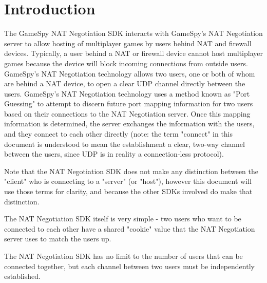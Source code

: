 \documentclass[oneside,titlepage,a4paper]{Definition/retrospy} %
\begin{document}
\chapter{Introduction}
The GameSpy NAT Negotiation SDK interacts with GameSpy's NAT Negotiation server to allow hosting of multiplayer games by users behind NAT and firewall devices. Typically, a user behind a NAT or firewall device cannot host multiplayer games because the device will block incoming connections from outside users. GameSpy's NAT Negotiation technology allows two users, one or both of whom are behind a NAT device, to open a clear UDP channel directly between the users.
GameSpy's NAT Negotiation technology uses a method known as "Port Guessing" to attempt to discern future port mapping information for two users based on their connections to the NAT Negotiation server. Once this mapping information is determined, the server exchanges the information with the users, and they connect to each other directly (note: the term "connect" in this document is understood to mean the establishment a clear, two-way channel between the users, since UDP is in reality a connection-less protocol).

Note that the NAT Negotiation SDK does not make any distinction between the "client" who is connecting to a "server" (or "host"), however this document will use those terms for clarity, and because the other SDKs involved do make that distinction.

The NAT Negotiation SDK itself is very simple - two users who want to be connected to each other have a shared "cookie" value that the NAT Negotiation server uses to match the users up. 

The NAT Negotiation SDK has no limit to the number of users that can be connected together, but each channel between two users must be independently established.
\end{document}
